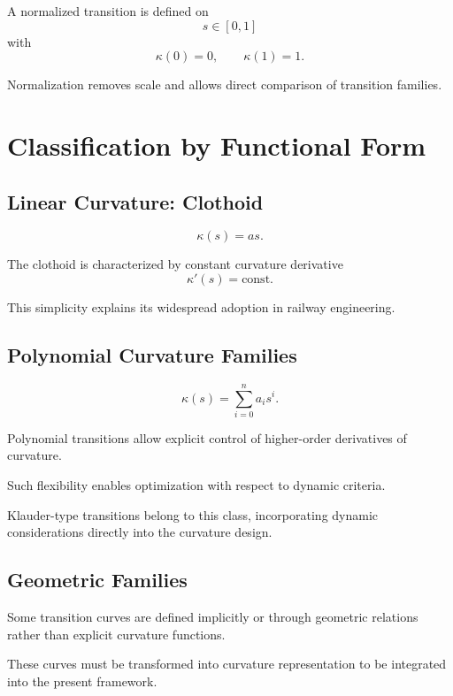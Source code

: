 \begin{definition}
A normalized transition is defined on
\[
s \in [0,1]
\]
with
\[
\kappa(0)=0, \qquad \kappa(1)=1.
\]
\end{definition}

Normalization removes scale and allows direct comparison of transition
families.


\section{Classification by Functional Form}

\subsection{Linear Curvature: Clothoid}

\begin{definition}
\[
\kappa(s) = a s.
\]
\end{definition}

The clothoid is characterized by constant curvature derivative
\[
\kappa'(s) = \text{const}.
\]

This simplicity explains its widespread adoption in railway engineering.


\subsection{Polynomial Curvature Families}

\begin{definition}
\[
\kappa(s) = \sum_{i=0}^{n} a_i s^i.
\]
\end{definition}

Polynomial transitions allow explicit control of higher-order
derivatives of curvature.

Such flexibility enables optimization with respect to dynamic criteria.

Klauder-type transitions belong to this class, incorporating dynamic
considerations directly into the curvature design.


\subsection{Geometric Families}

Some transition curves are defined implicitly or through geometric
relations rather than explicit curvature functions.

These curves must be transformed into curvature representation to be
integrated into the present framework.


